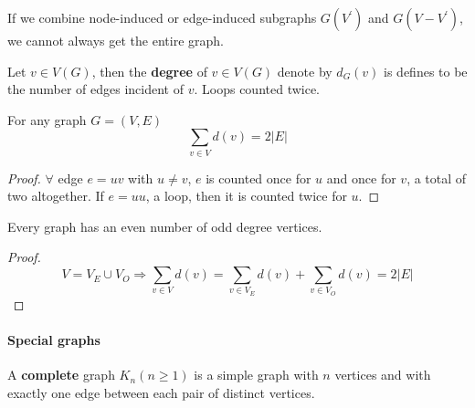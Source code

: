                 If we combine node-induced or edge-induced subgraphs $G(V^\prime )$ and $G(V - V^\prime )$, we cannot always get the entire graph.

                \begin{definition}[Degree]
                    Let $v\in V(G)$, then the \textbf{degree} of $v\in V(G)$ denote by $d_G(v)$ is defines to be the number of edges incident of $v$. Loops counted twice.
                \end{definition}

                \begin{theorem}
                    For any graph $G=(V, E)$
                    \begin{equation*}
                        \sum_{v\in V}d(v) = 2|E|
                    \end{equation*}
                \end{theorem}

                \begin{proof}
                    $\forall$ edge $e=uv$ with $u \neq v$, $e$ is counted once for $u$ and once for $v$, a total of two altogether. If $e=uu$, a loop, then it is counted twice for $u$.
                \end{proof}

                \begin{corollary}
                    Every graph has an even number of odd degree vertices.
                \end{corollary}

                \begin{proof}
                    \begin{equation*}
                        V = V_E\cup V_O \Rightarrow 
                        \sum_{v\in V}d(v) = \sum_{v\in V_E} d(v) + \sum_{v\in V_O}d(v) = 2|E|
                    \end{equation*}
                \end{proof}

            \paragraph{Special graphs}
                \begin{definition}
                    A \textbf{complete} graph $K_n (n \ge 1)$ is a simple graph with $n$ vertices and with exactly one edge between each pair of distinct vertices.
                \end{definition}

